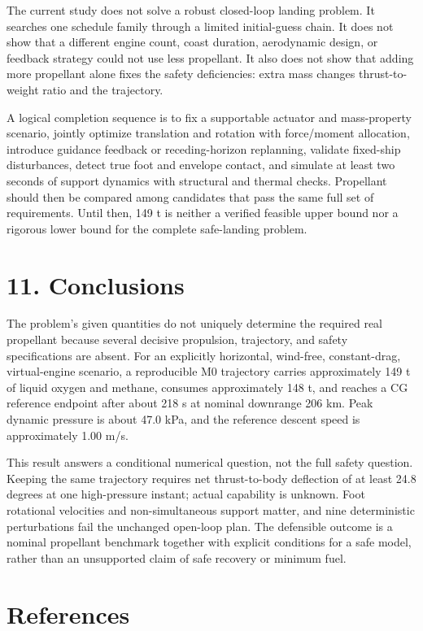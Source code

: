 \documentclass[
  11pt,
  a4paper,
]{article}
\begin{document}
The current study does not solve a robust closed-loop landing problem.
It searches one schedule family through a limited initial-guess chain.
It does not show that a different engine count, coast duration,
aerodynamic design, or feedback strategy could not use less propellant.
It also does not show that adding more propellant alone fixes the safety
deficiencies: extra mass changes thrust-to-weight ratio and the
trajectory.

A logical completion sequence is to fix a supportable actuator and
mass-property scenario, jointly optimize translation and rotation with
force/moment allocation, introduce guidance feedback or receding-horizon
replanning, validate fixed-ship disturbances, detect true foot and
envelope contact, and simulate at least two seconds of support dynamics
with structural and thermal checks. Propellant should then be compared
among candidates that pass the same full set of requirements. Until
then, 149 t is neither a verified feasible upper bound nor a rigorous
lower bound for the complete safe-landing problem.

\section{11. Conclusions}\label{conclusions}

The problem's given quantities do not uniquely determine the required
real propellant because several decisive propulsion, trajectory, and
safety specifications are absent. For an explicitly horizontal,
wind-free, constant-drag, virtual-engine scenario, a reproducible M0
trajectory carries approximately 149 t of liquid oxygen and methane,
consumes approximately 148 t, and reaches a CG reference endpoint after
about 218 s at nominal downrange 206 km. Peak dynamic pressure is about
47.0 kPa, and the reference descent speed is approximately 1.00 m/s.

This result answers a conditional numerical question, not the full
safety question. Keeping the same trajectory requires net thrust-to-body
deflection of at least 24.8 degrees at one high-pressure instant; actual
capability is unknown. Foot rotational velocities and non-simultaneous
support matter, and nine deterministic perturbations fail the unchanged
open-loop plan. The defensible outcome is a nominal propellant benchmark
together with explicit conditions for a safe model, rather than an
unsupported claim of safe recovery or minimum fuel.

\section*{References}\label{references}
\end{document}
